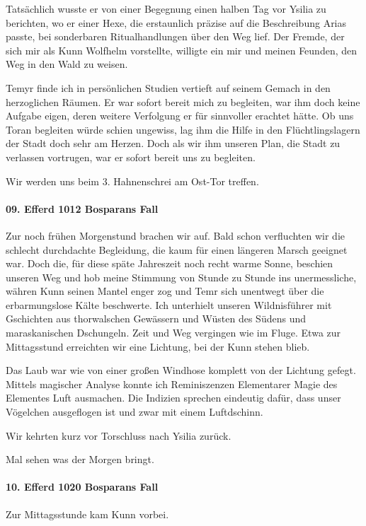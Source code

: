 Tatsächlich wusste er von einer Begegnung einen halben Tag vor Ysilia zu berichten, wo er einer Hexe, die erstaunlich präzise auf die Beschreibung Arias passte, bei sonderbaren Ritualhandlungen über den Weg lief. Der Fremde, der sich mir als Kunn Wolfhelm vorstellte, willigte ein mir und meinen Feunden, den Weg in den Wald zu weisen.

Temyr finde ich in persönlichen Studien vertieft auf seinem Gemach in den herzoglichen Räumen. Er war sofort bereit mich zu begleiten, war ihm doch keine Aufgabe eigen, deren weitere Verfolgung er für sinnvoller erachtet hätte. Ob uns Toran begleiten würde schien ungewiss, lag ihm die Hilfe in den Flüchtlingslagern der Stadt doch sehr am Herzen. Doch als wir ihm unseren Plan, die Stadt zu verlassen vortrugen, war er sofort bereit uns zu begleiten.

Wir werden uns beim 3. Hahnenschrei am Ost-Tor treffen.

\paragraph{09. Efferd 1012 Bosparans Fall}
Zur noch frühen Morgenstund brachen wir auf. Bald schon verfluchten wir die schlecht durchdachte Begleidung, die kaum für einen längeren Marsch geeignet war. Doch die, für diese späte Jahreszeit noch recht warme Sonne, beschien unseren Weg und hob meine Stimmung von Stunde zu Stunde ins unermessliche, währen Kunn seinen Mantel enger zog und Temr sich unentwegt über die erbarmungslose Kälte beschwerte. Ich unterhielt unseren Wildnisführer mit Gschichten aus thorwalschen Gewässern und Wüsten des Südens und maraskanischen Dschungeln. Zeit und Weg vergingen wie im Fluge. Etwa zur Mittagsstund erreichten wir eine Lichtung, bei der Kunn stehen blieb.

Das Laub war wie von einer großen Windhose komplett von der Lichtung gefegt. Mittels magischer Analyse konnte ich Reminiszenzen Elementarer Magie des Elementes Luft ausmachen. Die Indizien sprechen eindeutig dafür, dass unser Vögelchen ausgeflogen ist und zwar mit einem Luftdschinn.

Wir kehrten kurz vor Torschluss nach Ysilia zurück.

Mal sehen was der Morgen bringt.

\paragraph{10. Efferd 1020 Bosparans Fall}
Zur Mittagsstunde kam Kunn vorbei.

